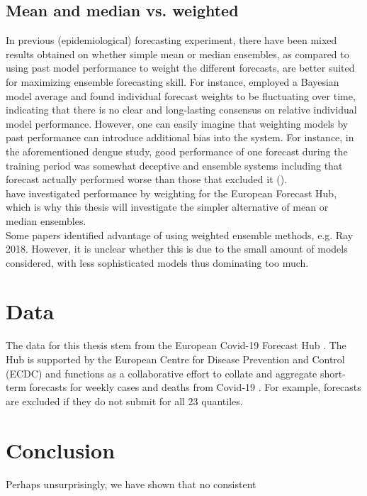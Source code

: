 \documentclass[11pt]{article}
\begin{document}
\subsection{Mean and median vs. weighted}
In previous (epidemiological) forecasting experiment, there have been mixed results obtained on whether simple mean or median ensembles, as compared to using past model performance to weight the different forecasts, are better suited for maximizing ensemble forecasting skill. For instance, \cite{yamana_superensemble_2016} employed a Bayesian model average and found individual forecast weights to be fluctuating over time, indicating that there is no clear and long-lasting consensus on relative individual model performance. However, one can easily imagine that weighting models by past performance can introduce additional bias into the system. For instance, in the aforementioned dengue study, good performance of one forecast during the training period was somewhat deceptive and ensemble systems including that forecast actually performed worse than those that excluded it (\cite{yamana_superensemble_2016}).\\
\cite{sherratt_draft_nodate} have investigated performance by weighting for the European Forecast Hub, which is why this thesis will investigate the simpler alternative of mean or median ensembles. \\
Some papers identified advantage of using weighted ensemble methods, e.g. Ray 2018. However, it is unclear whether this is due to the small amount of models considered, with less sophisticated models thus dominating too much.
\section{Data}
The data for this thesis stem from the European Covid-19 Forecast Hub \cite{noauthor_european_2021}. The Hub is supported by the European Centre for Disease Prevention and Control (ECDC) and functions as a collaborative effort to collate and aggregate short-term forecasts for weekly cases and deaths from Covid-19 \citep{sherratt_draft_nodate}. For example, forecasts are excluded if they do not submit for all 23 quantiles.
\section{Conclusion}
Perhaps unsurprisingly, we have shown that no consistent 
\newpage

\end{document}
